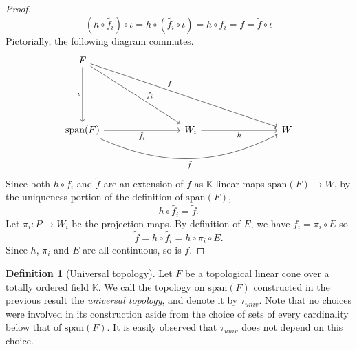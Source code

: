 \documentclass[a4paper,11pt]{article}
\numberwithin{equation}{section}
\theoremstyle{definition}
\newtheorem{Definition}{Definition}[section]
\theoremstyle{plain}
\newcommand{\spn}{\mathrm{span}}
\begin{document}
\begin{proof}
    $$(h \circ \tilde{f_{i}}) \circ \iota = h \circ (\tilde{f_{i}} \circ \iota) = h \circ f_{i} = f = \tilde{f} \circ \iota$$
    Pictorially, the following diagram commutes.
    $$
        \begin{tikzcd}[row sep=2cm, column sep=2.8cm] 
          F \arrow[d, "\iota"'] 
            \arrow[dr, "f_i", pos=0.6] 
            \arrow[drr, "f", pos=0.4] 
          & & \\
          \text{span}(F) \arrow[r, "\tilde{f_i}"'] 
                         \arrow[rr, "\tilde{f}"', bend right=25] 
          & W_i \arrow[r, "h"'] 
          & W 
        \end{tikzcd}
    $$
    Since both $h \circ \tilde{f_{i}}$ and $\tilde{f}$ are an extension of $f$ as $\mathbb{K}$-linear maps $\spn(F) \to W$, by the uniqueness portion of the definition of $\spn(F)$,
    $$h \circ \tilde{f_{i}} = \tilde{f}.$$
    Let $\pi_{i}: P \longrightarrow W_{i}$ be the projection maps. By definition of $E$, we have $\tilde{f_{i}} = \pi_{i} \circ E$ so
    $$\tilde{f} = h \circ \tilde{f_{i}} = h \circ \pi_{i} \circ E.$$
    Since $h$, $\pi_{i}$ and $E$ are all continuous, so is $\tilde{f}$.
\end{proof}

\begin{Definition}[Universal topology]
Let $F$ be a topological linear cone over a totally ordered field $\mathbb{K}$. We call the topology on $\spn(F)$ constructed in the previous result the \emph{universal topology}, and denote it by $\tau_{univ}$. Note that no choices were involved in its construction aside from the choice of sets of every cardinality below that of $\spn(F)$. It is easily observed that $\tau_{univ}$ does not depend on this choice.
\end{Definition}
\end{document}
